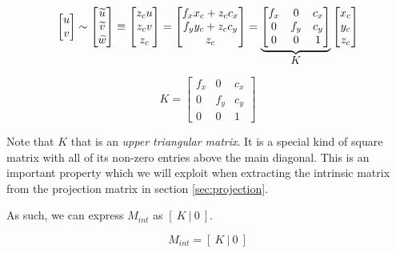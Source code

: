 \begin{equation}
    \begin{bmatrix}
        u \\ v
    \end{bmatrix}
    \sim
    \begin{bmatrix}
        \widetilde{u} \\ \widetilde{v} \\ \widetilde{w}
    \end{bmatrix}
    \equiv
    \begin{bmatrix}
        z_c u \\ z_c v \\ z_c
    \end{bmatrix}
    =
    \begin{bmatrix}
        f_x x_c + z_c c_x \\ f_y y_c + z_c c_y \\ z_c
    \end{bmatrix}
    =
    \underbrace{
        \begin{bmatrix}
            f_x & 0   & c_x  \\
            0   & f_y & c_y  \\
            0   & 0   & 1   
        \end{bmatrix}
    }_{\mathlarger{K}}
    \begin{bmatrix}
        x_c \\ y_c \\ z_c 
    \end{bmatrix}
\end{equation}


\begin{equation}
    K =
    \begin{bmatrix}
        f_x & 0   & c_x \\
        0   & f_y & c_y \\
        0   & 0   & 1
    \end{bmatrix}
\end{equation}

Note that $K$ that is an \emph{upper triangular matrix}. It is a special kind of square matrix with all of its non-zero entries above the main diagonal. This is an important property which we will exploit when extracting the intrinsic matrix from the projection matrix in section \ref{sec:projection}.

As such, we can express $M_{int}$ as $\left[\: K \:\vert\: 0 \:\right]$.

\begin{equation}
    M_{int} = \left[\: K \:\vert\: 0 \:\right]
\end{equation}

